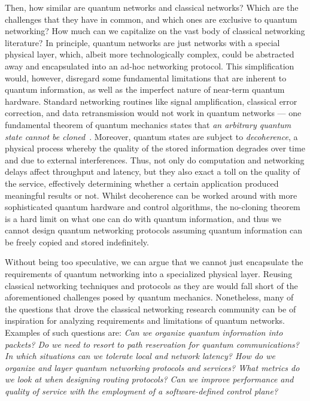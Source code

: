 Then, how similar are quantum networks and classical networks? Which are the challenges that they
have in common, and which ones are exclusive to quantum networking? How much can we capitalize on
the vast body of classical networking literature? In principle, quantum networks are just networks
with a special physical layer, which, albeit more technologically complex, could be abstracted away
and encapsulated into an ad-hoc networking protocol. This simplification would, however, disregard
some fundamental limitations that are inherent to quantum information, as well as the imperfect
nature of near-term quantum hardware. Standard networking routines like signal amplification,
classical error correction, and data retransmission would not work in quantum networks --- one
fundamental theorem of quantum mechanics states that \emph{an arbitrary quantum state cannot be
cloned}~\cite{wootters_1982_nocloning, dieks_1982_communication}. Moreover, quantum states are
subject to \emph{decoherence}, a physical process whereby the quality of the stored information
degrades over time and due to external interferences. Thus, not only do computation and networking
delays affect throughput and latency, but they also exact a toll on the quality of the service,
effectively determining whether a certain application produced meaningful results or not. Whilst
decoherence can be worked around with more sophisticated quantum hardware and control algorithms,
the no-cloning theorem is a hard limit on what one can do with quantum information, and thus we
cannot design quantum networking protocols assuming quantum information can be freely copied and
stored indefinitely.

Without being too speculative, we can argue that we cannot just encapsulate the requirements of
quantum networking into a specialized physical layer. Reusing classical networking techniques and
protocols as they are would fall short of the aforementioned challenges posed by quantum mechanics.
Nonetheless, many of the questions that drove the classical networking research community can be of
inspiration for analyzing requirements and limitations of quantum networks. Examples of such
questions are: \emph{Can we organize quantum information into packets? Do we need to resort to path
reservation for quantum communications? In which situations can we tolerate local and network
latency? How do we organize and layer quantum networking protocols and services? What metrics do we
look at when designing routing protocols? Can we improve performance and quality of service with the
employment of a software-defined control plane?}

